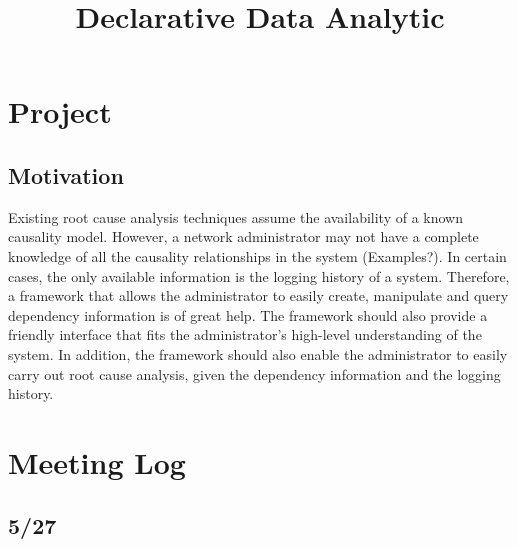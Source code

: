 \documentclass{article}
\begin{document}


\title{Declarative Data Analytic}
\author{}

\maketitle


\section{Project}
\label{sec:project}

\subsection{Motivation}
\label{sec:motiv}

Existing root cause analysis techniques assume the availability of a known
causality model. However, a network administrator may not have a complete
knowledge of all the causality relationships in the system (Examples?). In
certain cases, the only available information is the logging history of a
system. Therefore, a framework that allows the administrator to easily
create, manipulate and query dependency information is of great help. The
framework should also provide a friendly interface that fits the administrator's
high-level understanding of the system. In addition, the framework should also
enable the administrator to easily carry out root cause analysis, given the
dependency information and the logging history.



\section{Meeting Log}
\label{sec:meetlog}

\subsection{5/27}
\end{document}
